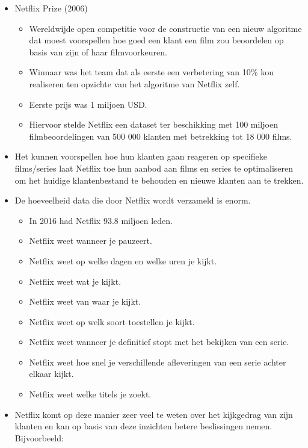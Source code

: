 \documentclass[]{tufte-book}
\providecommand{\tightlist}{%
  \setlength{\itemsep}{0pt}\setlength{\parskip}{0pt}}
\begin{document}
\begin{itemize}
\tightlist
\item
  Netflix Prize (2006)

  \begin{itemize}
  \tightlist
  \item
    Wereldwijde open competitie voor de constructie van een nieuw algoritme dat moest voorspellen hoe goed een klant een film zou beoordelen op basis van zijn of haar filmvoorkeuren.
  \item
    Winnaar was het team dat als eerste een verbetering van 10\% kon realiseren ten opzichte van het algoritme van Netflix zelf.
  \item
    Eerste prijs was 1 miljoen USD.
  \item
    Hiervoor stelde Netflix een dataset ter beschikking met 100 miljoen filmbeoordelingen van 500 000 klanten met betrekking tot 18 000 films.
  \end{itemize}
\item
  Het kunnen voorspellen hoe hun klanten gaan reageren op specifieke films/series laat Netflix toe hun aanbod aan films en series te optimaliseren om het huidige klantenbestand te behouden en nieuwe klanten aan te trekken.
\item
  De hoeveelheid data die door Netflix wordt verzameld is enorm.

  \begin{itemize}
  \tightlist
  \item
    In 2016 had Netflix 93.8 miljoen leden.
  \item
    Netflix weet wanneer je pauzeert.
  \item
    Netflix weet op welke dagen en welke uren je kijkt.
  \item
    Netflix weet wat je kijkt.
  \item
    Netflix weet van waar je kijkt.
  \item
    Netflix weet op welk soort toestellen je kijkt.
  \item
    Netflix weet wanneer je definitief stopt met het bekijken van een serie.
  \item
    Netflix weet hoe snel je verschillende afleveringen van een serie achter elkaar kijkt.
  \item
    Netflix weet welke titels je zoekt.
  \end{itemize}
\item
  Netflix komt op deze manier zeer veel te weten over het kijkgedrag van zijn klanten en kan op basis van deze inzichten betere beslissingen nemen. Bijvoorbeeld:


\end{itemize}
\end{document}

